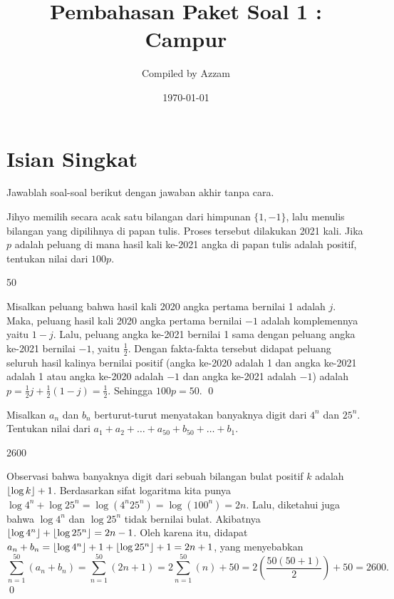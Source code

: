 \documentclass[11pt]{scrartcl}
\begin{document}
	\title{Pembahasan Paket Soal 1 : Campur} %
	\date{\today}
	\author{Compiled by Azzam}
	\maketitle
	\newpage
	

	\section{Isian Singkat}
	Jawablah soal-soal berikut dengan jawaban akhir tanpa cara.
	
	\begin{soaljawab}
		Jihyo memilih secara acak satu bilangan dari himpunan $\{1,-1\}$, lalu menulis bilangan yang dipilihnya di papan tulis. Proses tersebut dilakukan 2021 kali. Jika $p$ adalah peluang di mana hasil kali ke-2021 angka di papan tulis adalah positif, tentukan nilai dari $100p$.
		
		\begin{jawaban}
						50
					\end{jawaban}
					\begin{solusi}
					Misalkan peluang bahwa hasil kali 2020 angka pertama bernilai 1 adalah $j$. Maka, peluang hasil kali 2020 angka pertama bernilai $-1$ adalah komplemennya yaitu $1-j$. Lalu, peluang angka ke-2021 bernilai 1 sama dengan peluang angka ke-2021 bernilai $-1$, yaitu $\frac{1}{2}$. Dengan fakta-fakta tersebut didapat peluang seluruh hasil kalinya bernilai positif (angka ke-2020 adalah 1 dan angka ke-2021 adalah 1 atau angka ke-2020 adalah $-1$ dan angka ke-2021 adalah $-1$) adalah $p=\frac{1}{2}j+\frac{1}{2}(1-j) = \frac{1}{2}$. Sehingga $100p = 50$. \qed
					\end{solusi}
	\end{soaljawab}
	
	\begin{soaljawab}
		Misalkan $a_n$ dan $b_n$ berturut-turut menyatakan banyaknya digit dari $4^n$ dan $25^n$. Tentukan nilai dari $a_1+a_2+\dots +a_{50}+b_{50}+\dots+b_1$.
		
		\begin{jawaban}
				2600
				\end{jawaban}
				\begin{solusi}
				Observasi bahwa banyaknya digit dari sebuah bilangan bulat positif $k$ adalah $\left\lfloor \log k \right\rfloor+1$. Berdasarkan sifat logaritma kita punya $\log 4^n + \log 25^n = \log (4^n25^n) = \log (100^n) = 2n$. Lalu, diketahui juga bahwa $\log 4^n$ dan $\log 25^n$ tidak bernilai bulat. Akibatnya $\left\lfloor \log 4^n \right\rfloor+\left\lfloor \log 25^n \right\rfloor = 2n-1$. Oleh karena itu, didapat $a_n+b_n =\left\lfloor \log 4^n \right\rfloor+1+\left\lfloor \log 25^n \right\rfloor+1= 2n+1$, yang menyebabkan $$\sum_{n=1}^{50}(a_n+b_n)=\sum_{n=1}^{50}(2n+1)=2\sum_{n=1}^{50}(n)+50=2\left(\frac{50(50+1)}{2}\right)+50=2600.$$ \qed
				\end{solusi}
	\end{soaljawab}
\end{document}
